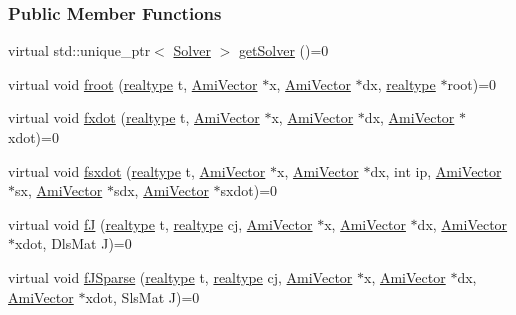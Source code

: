\subsubsection*{Public Member Functions}
\begin{DoxyCompactItemize}
\item 
virtual std\+::unique\+\_\+ptr$<$ \mbox{\hyperlink{classamici_1_1_solver}{Solver}} $>$ \mbox{\hyperlink{classamici_1_1_abstract_model_a61d5b19b2e4d5ffcc73a014d59494344}{get\+Solver}} ()=0
\item 
virtual void \mbox{\hyperlink{classamici_1_1_abstract_model_a9124751917d81611cc237c853d9cf6b6}{froot}} (\mbox{\hyperlink{namespaceamici_a1bdce28051d6a53868f7ccbf5f2c14a3}{realtype}} t, \mbox{\hyperlink{classamici_1_1_ami_vector}{Ami\+Vector}} $\ast$x, \mbox{\hyperlink{classamici_1_1_ami_vector}{Ami\+Vector}} $\ast$dx, \mbox{\hyperlink{namespaceamici_a1bdce28051d6a53868f7ccbf5f2c14a3}{realtype}} $\ast$root)=0
\item 
virtual void \mbox{\hyperlink{classamici_1_1_abstract_model_a30b9be6c722585f984c9406d8831703e}{fxdot}} (\mbox{\hyperlink{namespaceamici_a1bdce28051d6a53868f7ccbf5f2c14a3}{realtype}} t, \mbox{\hyperlink{classamici_1_1_ami_vector}{Ami\+Vector}} $\ast$x, \mbox{\hyperlink{classamici_1_1_ami_vector}{Ami\+Vector}} $\ast$dx, \mbox{\hyperlink{classamici_1_1_ami_vector}{Ami\+Vector}} $\ast$xdot)=0
\item 
virtual void \mbox{\hyperlink{classamici_1_1_abstract_model_ac95e201045b3eda5d4684996311567c5}{fsxdot}} (\mbox{\hyperlink{namespaceamici_a1bdce28051d6a53868f7ccbf5f2c14a3}{realtype}} t, \mbox{\hyperlink{classamici_1_1_ami_vector}{Ami\+Vector}} $\ast$x, \mbox{\hyperlink{classamici_1_1_ami_vector}{Ami\+Vector}} $\ast$dx, int ip, \mbox{\hyperlink{classamici_1_1_ami_vector}{Ami\+Vector}} $\ast$sx, \mbox{\hyperlink{classamici_1_1_ami_vector}{Ami\+Vector}} $\ast$sdx, \mbox{\hyperlink{classamici_1_1_ami_vector}{Ami\+Vector}} $\ast$sxdot)=0
\item 
virtual void \mbox{\hyperlink{classamici_1_1_abstract_model_a7df960e9bdb8245155e53e5fbb6d2c6a}{fJ}} (\mbox{\hyperlink{namespaceamici_a1bdce28051d6a53868f7ccbf5f2c14a3}{realtype}} t, \mbox{\hyperlink{namespaceamici_a1bdce28051d6a53868f7ccbf5f2c14a3}{realtype}} cj, \mbox{\hyperlink{classamici_1_1_ami_vector}{Ami\+Vector}} $\ast$x, \mbox{\hyperlink{classamici_1_1_ami_vector}{Ami\+Vector}} $\ast$dx, \mbox{\hyperlink{classamici_1_1_ami_vector}{Ami\+Vector}} $\ast$xdot, Dls\+Mat J)=0
\item 
virtual void \mbox{\hyperlink{classamici_1_1_abstract_model_a4b499d01a3e0504bcd8eda681b8da277}{f\+J\+Sparse}} (\mbox{\hyperlink{namespaceamici_a1bdce28051d6a53868f7ccbf5f2c14a3}{realtype}} t, \mbox{\hyperlink{namespaceamici_a1bdce28051d6a53868f7ccbf5f2c14a3}{realtype}} cj, \mbox{\hyperlink{classamici_1_1_ami_vector}{Ami\+Vector}} $\ast$x, \mbox{\hyperlink{classamici_1_1_ami_vector}{Ami\+Vector}} $\ast$dx, \mbox{\hyperlink{classamici_1_1_ami_vector}{Ami\+Vector}} $\ast$xdot, Sls\+Mat J)=0

\end{DoxyCompactItemize}
